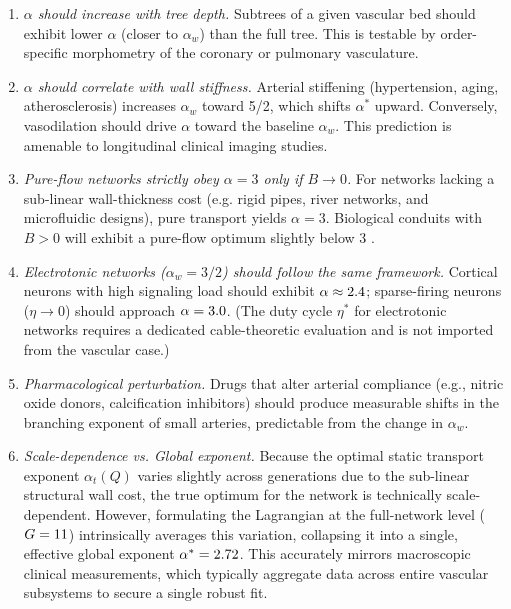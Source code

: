 \documentclass[11pt,a4paper]{article}
\theoremstyle{remark}
\begin{document}
\begin{enumerate}
\item \emph{$\alpha$ should increase with tree depth.}
Subtrees of a given vascular bed should exhibit lower $\alpha$ (closer to
$\alpha_w$) than the full tree.
This is testable by order-specific morphometry of the coronary or pulmonary
vasculature.

\item \emph{$\alpha$ should correlate with wall stiffness.}
Arterial stiffening (hypertension, aging, atherosclerosis) increases $\alpha_w$
toward 5/2, which shifts $\alpha^*$ upward.
Conversely, vasodilation should drive $\alpha$ toward the baseline $\alpha_w$.
This prediction is amenable to longitudinal clinical imaging studies.

\item \emph{Pure-flow networks strictly obey $\alpha = 3$ only if $B \to 0$.}
For networks lacking a sub-linear wall-thickness cost (e.g. rigid pipes, river
networks, and microfluidic designs), pure transport yields $\alpha=3$.
Biological conduits with $B>0$ will exhibit a pure-flow optimum slightly below 3
\cite{Marchesi2026static}.

\item \emph{Electrotonic networks ($\alpha_w = 3/2$) should follow the same framework.}
Cortical neurons with high signaling load should exhibit $\alpha \approx
2.4$; sparse-firing neurons ($\eta \to 0$) should approach
$\alpha = 3.0$. (The duty cycle $\eta^*$ for electrotonic networks
requires a dedicated cable-theoretic evaluation and is not imported from the
vascular case.)

\item \emph{Pharmacological perturbation.}
Drugs that alter arterial compliance (e.g., nitric oxide donors, calcification
inhibitors) should produce measurable shifts in the branching exponent of small
arteries, predictable from the change in $\alpha_w$.

\item \emph{Scale-dependence vs. Global exponent.}
Because the optimal static transport exponent $\alpha_t(Q)$ varies slightly
across generations due to the sub-linear structural wall cost, the true optimum
for the network is technically scale-dependent. However, formulating the
Lagrangian at the full-network level ($G=11$) intrinsically averages this
variation, collapsing it into a single, effective global exponent $\alpha^* =
2.72$. This accurately mirrors macroscopic clinical measurements, which
typically aggregate data across entire vascular subsystems to secure a single
robust fit.


\end{enumerate}
\end{document}
